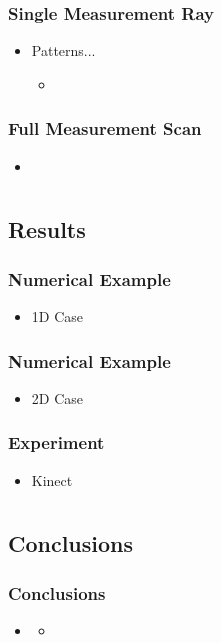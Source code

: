 \documentclass[11pt,professionalfonts,hyperref={pdftex,pdfpagemode=none,pdfstartview=FitH}]{beamer}
\begin{document}
\begin{frame}
\frametitle{Single Measurement Ray}

\begin{itemize}
    \item Patterns...
	\begin{itemize}
		\item 
	\end{itemize}
\end{itemize}
\end{frame}




\begin{frame}
\frametitle{Full Measurement Scan}

\begin{itemize}
	\item 
\end{itemize}

\end{frame}


\section*{}
\subsection*{Results}

\begin{frame}
\frametitle{Numerical Example}

\begin{itemize}
\item 1D Case
\end{itemize}

\end{frame}

\begin{frame}
\frametitle{Numerical Example}

\begin{itemize}
\item 2D Case
\end{itemize}

\end{frame}


\begin{frame}
\frametitle{Experiment}

\begin{itemize}
\item Kinect
\end{itemize}

\end{frame}



\section*{}
\subsection*{Conclusions}

\begin{frame}
\frametitle{Conclusions}
\begin{itemize}
    \item 
    \begin{itemize}
        \item 
    \end{itemize}
\end{itemize}
\end{frame}
\end{document}
